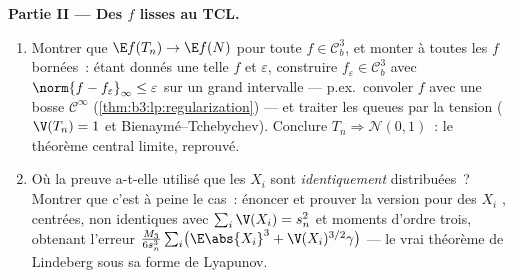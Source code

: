 \begin{problem}
\medskip
\noindent\textbf{Partie II --- Des $f$ lisses au TCL.}
\begin{enumerate}[resume]
  \item Montrer que $\E f(T_n) \to \E f(N)$ pour toute $f
        \in \mathcal C_b^3$, et monter à toutes les $f$
         bornées~: étant donnés une telle $f$ et
        $\varepsilon$, construire $f_\varepsilon \in
        \mathcal C^3_b$ avec $\norm{f - f_\varepsilon}_\infty
        \leq \varepsilon$ sur un grand intervalle --- p.ex.\
        convoler $f$ avec une bosse $\mathcal C^\infty$
        (\cref{thm:b3:lp:regularization}) --- et traiter les
        queues par la tension ($\V(T_n) = 1$ et
        Bienaymé--Tchebychev). Conclure $T_n \Rightarrow
        \mathcal N(0, 1)$~: le théorème central limite,
        reprouvé.
  \item Où la preuve a-t-elle utilisé que les $X_i$ sont
        \emph{identiquement} distribuées~? Montrer que
        c'est à peine le cas~: énoncer et prouver la
        version pour des $X_i$ , centrées, non
        identiques avec $\sum_i\V(X_i) = s_n^2$ et moments
        d'ordre trois, obtenant l'erreur
        $\frac{M_3}{6s_n^3}\sum_i\bigl(\E\abs{X_i}^3 +
        \V(X_i)^{3/2}\gamma\bigr)$ --- le vrai théorème de
        Lindeberg sous sa forme de Lyapunov.
\end{enumerate}


\end{problem}
